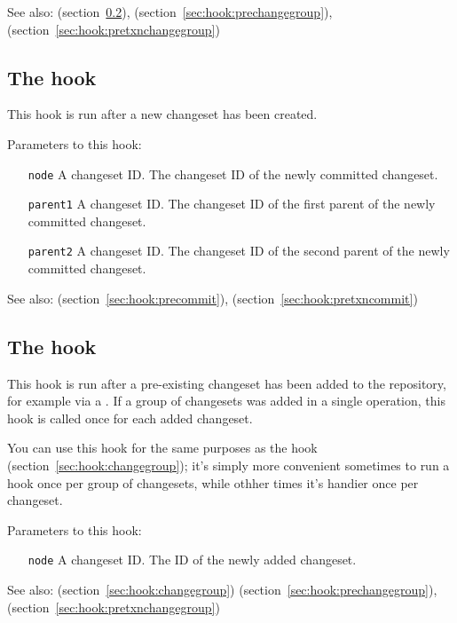 See also:  (section~\ref{sec:hook:incoming}),
 (section~\ref{sec:hook:prechangegroup}),
 (section~\ref{sec:hook:pretxnchangegroup})

\subsection{The  hook}
\label{sec:hook:commit}

This hook is run after a new changeset has been created.

Parameters to this hook:
\begin{itemize}
\item[\texttt{node}] A changeset ID.  The changeset ID of the newly
  committed changeset.
\item[\texttt{parent1}] A changeset ID.  The changeset ID of the first
  parent of the newly committed changeset.
\item[\texttt{parent2}] A changeset ID.  The changeset ID of the second
  parent of the newly committed changeset.
\end{itemize}

See also:  (section~\ref{sec:hook:precommit}),
 (section~\ref{sec:hook:pretxncommit})

\subsection{The  hook}
\label{sec:hook:incoming}

This hook is run after a pre-existing changeset has been added to the
repository, for example via a .  If a group of changesets
was added in a single operation, this hook is called once for each
added changeset.

You can use this hook for the same purposes as the 
hook (section~\ref{sec:hook:changegroup}); it's simply more convenient
sometimes to run a hook once per group of changesets, while othher
times it's handier once per changeset.

Parameters to this hook:
\begin{itemize}
\item[\texttt{node}] A changeset ID.  The ID of the newly added
  changeset.
\end{itemize}

See also:  (section~\ref{sec:hook:changegroup})  (section~\ref{sec:hook:prechangegroup}),  (section~\ref{sec:hook:pretxnchangegroup})

